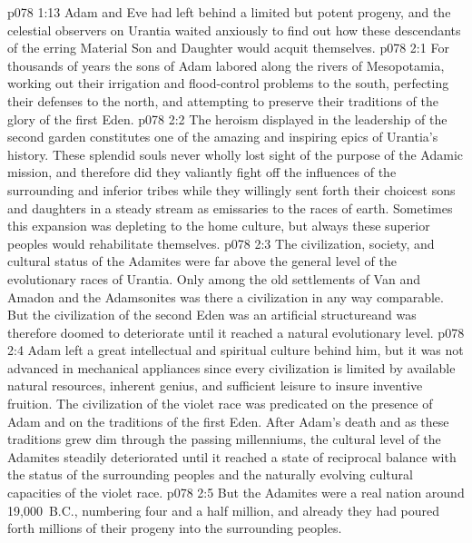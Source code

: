 \vs p078 1:13 Adam and Eve had left behind a limited but potent progeny, and the celestial observers on Urantia waited anxiously to find out how these descendants of the erring Material Son and Daughter would acquit themselves.
\vs p078 2:1 For thousands of years the sons of Adam labored along the rivers of Mesopotamia, working out their irrigation and flood\hyp{}control problems to the south, perfecting their defenses to the north, and attempting to preserve their traditions of the glory of the first Eden.
\vs p078 2:2 The heroism displayed in the leadership of the second garden constitutes one of the amazing and inspiring epics of Urantia’s history. These splendid souls never wholly lost sight of the purpose of the Adamic mission, and therefore did they valiantly fight off the influences of the surrounding and inferior tribes while they willingly sent forth their choicest sons and daughters in a steady stream as emissaries to the races of earth. Sometimes this expansion was depleting to the home culture, but always these superior peoples would rehabilitate themselves.
\vs p078 2:3 The civilization, society, and cultural status of the Adamites were far above the general level of the evolutionary races of Urantia. Only among the old settlements of Van and Amadon and the Adamsonites was there a civilization in any way comparable. But the civilization of the second Eden was an artificial structureand was therefore doomed to deteriorate until it reached a natural evolutionary level.
\vs p078 2:4 Adam left a great intellectual and spiritual culture behind him, but it was not advanced in mechanical appliances since every civilization is limited by available natural resources, inherent genius, and sufficient leisure to insure inventive fruition. The civilization of the violet race was predicated on the presence of Adam and on the traditions of the first Eden. After Adam’s death and as these traditions grew dim through the passing millenniums, the cultural level of the Adamites steadily deteriorated until it reached a state of reciprocal balance with the status of the surrounding peoples and the naturally evolving cultural capacities of the violet race.
\vs p078 2:5 But the Adamites were a real nation around 19,000~B.C., numbering four and a half million, and already they had poured forth millions of their progeny into the surrounding peoples.
%
